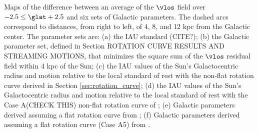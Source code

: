 \label{fig:six_pies}
Maps of the difference between an average of the $\vlos$ field over $-2.5 \leq \glat +2.5$ and six sets of Galactic parameters. The dashed arcs correspond to distances, from right to left, of 4, 8, and 12 kpc from the Galactic center. The parameter sets are: (a) the IAU standard (CITE?); (b) the Galactic parameter set, defined in Section ROTATION CURVE RESULTS AND STREAMING MOTIONS, that minimizes the square sum of the $\vlos$ residual field within 4 kpc of the Sun; (c) the IAU values of the Sun's Galactocentric radius and motion relative to the local standard of rest with the non-flat rotation curve derived in Section \ref{sec:rotation_curve}; (d) the IAU values of the Sun's Galactocentric radius and motion relative to the local standard of rest with the Case A(CHECK THIS) non-flat rotation curve of \citet{Clemens:1985dp}; (e) Galactic parameters derived assuming a flat rotation curve from \citet{Bovy_2012}; (f) Galactic parameters derived assuming a flat rotation curve (Case A5) from \citet{Reid:2014km}. 